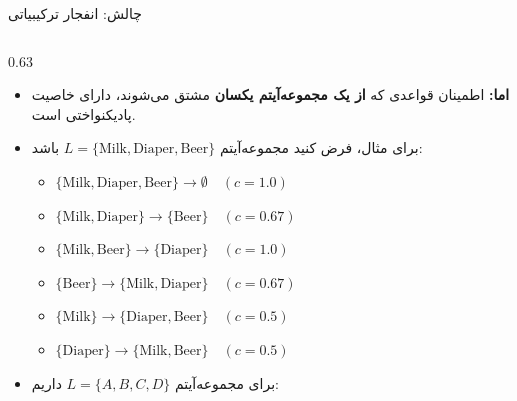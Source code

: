 \begin{frame}{چالش: انفجار ترکیبیاتی}{}
\begin{columns}[T,onlytextwidth]
\begin{column}{0.63\textwidth}
\begin{itemize}\setlength{\itemsep}{2pt}\footnotesize
    \item \textbf{اما:} اطمینان قواعدی که \textbf{از یک مجموعه‌آیتم یکسان} مشتق می‌شوند، دارای خاصیت پاد‌یکنواختی است.
    \item برای مثال، فرض کنید مجموعه‌آیتم $L = \{\text{Milk}, \text{Diaper}, \text{Beer}\}$ باشد:
    \begin{itemize}\setlength{\itemsep}{1pt}\scriptsize
        \item $\{\text{Milk}, \text{Diaper}, \text{Beer}\} \to \emptyset \quad (c = 1.0)$
        \item $\{\text{Milk}, \text{Diaper}\} \to \{\text{Beer}\} \quad (c = 0.67)$
        \item $\{\text{Milk}, \text{Beer}\} \to \{\text{Diaper}\} \quad (c = 1.0)$
        \item $\{\text{Beer}\} \to \{\text{Milk}, \text{Diaper}\} \quad (c = 0.67)$
        \item $\{\text{Milk}\} \to \{\text{Diaper}, \text{Beer}\} \quad (c = 0.5)$
        \item $\{\text{Diaper}\} \to \{\text{Milk}, \text{Beer}\} \quad (c = 0.5)$
    \end{itemize}
    \item برای مجموعه‌آیتم $L = \{A, B, C, D\}$ داریم:
    \par\vspace{1pt}\noindent{}\par\vspace{1pt}
\end{itemize}


\end{column}
\end{columns}
\end{frame}
